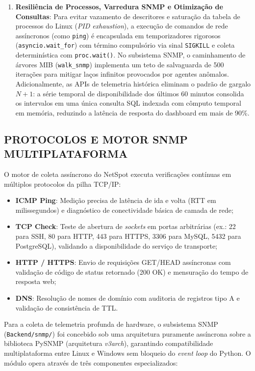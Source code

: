 \documentclass[12pt,a4paper]{article}
\begin{document}
\begin{enumerate}[leftmargin=1.25cm]
\item \textbf{Resiliência de Processos, Varredura SNMP e Otimização de Consultas}: Para evitar vazamento de descritores e saturação da tabela de processos do Linux (\textit{PID exhaustion}), a execução de comandos de rede assíncronos (como \texttt{ping}) é encapsulada em temporizadores rigorosos (\texttt{asyncio.wait\_for}) com término compulsório via sinal \texttt{SIGKILL} e coleta determinística com \texttt{proc.wait()}. No subsistema SNMP, o caminhamento de árvores MIB (\texttt{walk\_snmp}) implementa um teto de salvaguarda de 500 iterações para mitigar laços infinitos provocados por agentes anômalos. Adicionalmente, as APIs de telemetria histórica eliminam o padrão de gargalo $N+1$: a série temporal de disponibilidade dos últimos 60 minutos consolida os intervalos em uma única consulta SQL indexada com cômputo temporal em memória, reduzindo a latência de resposta do dashboard em mais de 90\%.
\end{enumerate}

\subsection{PROTOCOLOS E MOTOR SNMP MULTIPLATAFORMA}
O motor de coleta assíncrono do NetSpot executa verificações contínuas em múltiplos protocolos da pilha TCP/IP:
\begin{itemize}[leftmargin=1.25cm]
\item \textbf{ICMP Ping}: Medição precisa de latência de ida e volta (RTT em milissegundos) e diagnóstico de conectividade básica de camada de rede;
\item \textbf{TCP Check}: Teste de abertura de \textit{sockets} em portas arbitrárias (ex.: 22 para SSH, 80 para HTTP, 443 para HTTPS, 3306 para MySQL, 5432 para PostgreSQL), validando a disponibilidade do serviço de transporte;
\item \textbf{HTTP / HTTPS}: Envio de requisições GET/HEAD assíncronas com validação de código de status retornado (200 OK) e mensuração do tempo de resposta web;
\item \textbf{DNS}: Resolução de nomes de domínio com auditoria de registros tipo A e validação de consistência de TTL.
\end{itemize}

Para a coleta de telemetria profunda de hardware, o subsistema SNMP (\texttt{Backend/snmp/}) foi concebido sob uma arquitetura puramente assíncrona sobre a biblioteca PySNMP (arquitetura \textit{v3arch}), garantindo compatibilidade multiplataforma entre Linux e Windows sem bloqueio do \textit{event loop} do Python. O módulo opera através de três componentes especializados:
\end{document}
